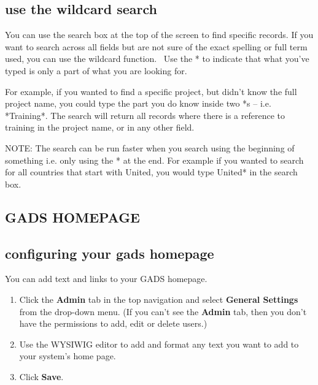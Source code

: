 \documentclass{ctrlo-int-toc}
\begin{document}
\subsection[use the wildcard search]{use the wildcard search}
You can use the search box at the top of the screen to find specific records. If you want to search across all fields but are not sure of the exact spelling or full term used, you can use the wildcard function. \ Use the * to indicate that what you've typed is only a part of what you are looking for.

For example, if you wanted to find a specific project, but didn't know the full project name, you could type the part you do know inside two *s -- i.e. *Training*. The search will return all records where there is a reference to training in the project name, or in any other field.

\begin{notebox}
NOTE: The search can be run faster when you search using the beginning of something i.e. only using the * at the end. For example if you wanted to search for all countries that start with United, you would type United* in the search box. 
\end{notebox}

\begin{admin}
\clearpage\section[GADS HOMEPAGE]{GADS HOMEPAGE}
\subsection[configuring your gads homepage]{configuring your gads homepage}
You can add text and links to your GADS homepage. 

\begin{enumerate}
\item Click the \textbf{Admin} tab in the top navigation and select \textbf{General Settings} from the drop-down menu. (If you can't see the \textbf{Admin} tab, then you don't have the permissions to add, edit or delete users.)
\item Use the WYSIWIG editor to add and format any text you want to add to your system's home page.
\item Click \textbf{Save}.
\end{enumerate}
\end{admin}
\end{document}
